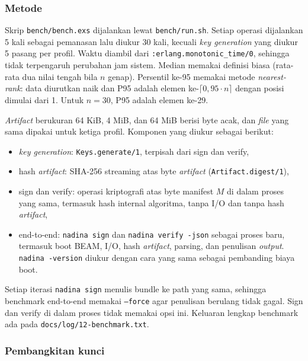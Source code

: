 \subsubsection*{Metode}
Skrip \texttt{bench/bench.exs} dijalankan lewat \texttt{bench/run.sh}. Setiap operasi
dijalankan 5 kali sebagai pemanasan lalu diukur 30 kali, kecuali \textit{key generation} yang
diukur 5 pasang per profil. Waktu diambil dari \texttt{:erlang.monotonic\_time/0}, sehingga
tidak terpengaruh perubahan jam sistem. Median memakai definisi biasa (rata-rata dua nilai
tengah bila $n$ genap). Persentil ke-95 memakai metode \textit{nearest-rank}: data diurutkan
naik dan P95 adalah elemen ke-$\lceil 0{,}95 \cdot n \rceil$ dengan posisi dimulai dari 1.
Untuk $n = 30$, P95 adalah elemen ke-29.

\textit{Artifact} berukuran 64 KiB, 4 MiB, dan 64 MiB berisi byte acak, dan \textit{file} yang sama dipakai
untuk ketiga profil. Komponen yang diukur sebagai berikut:

\begin{itemize}
  \item \textit{key generation}: \texttt{Keys.generate/1}, terpisah dari sign dan verify,
  \item hash \textit{artifact}: SHA-256 streaming atas byte \textit{artifact} (\texttt{Artifact.digest/1}),
  \item sign dan verify: operasi kriptografi atas byte manifest $M$ di dalam proses yang
    sama, termasuk hash internal algoritma, tanpa I/O dan tanpa hash \textit{artifact},
  \item end-to-end: \texttt{nadina sign} dan \texttt{nadina verify -json} sebagai proses
    baru, termasuk boot BEAM, I/O, hash \textit{artifact}, parsing, dan penulisan \textit{output}.
    \texttt{nadina -version} diukur dengan cara yang sama sebagai pembanding biaya boot.
\end{itemize}

Setiap iterasi \texttt{nadina sign} menulis bundle ke path yang sama, sehingga benchmark end-to-end
memakai \texttt{--force} agar penulisan berulang tidak gagal. Sign dan verify di dalam proses tidak
memakai opsi ini. Keluaran lengkap benchmark ada pada
\texttt{docs/log/12-benchmark.txt}.


\subsubsection*{Pembangkitan kunci}

